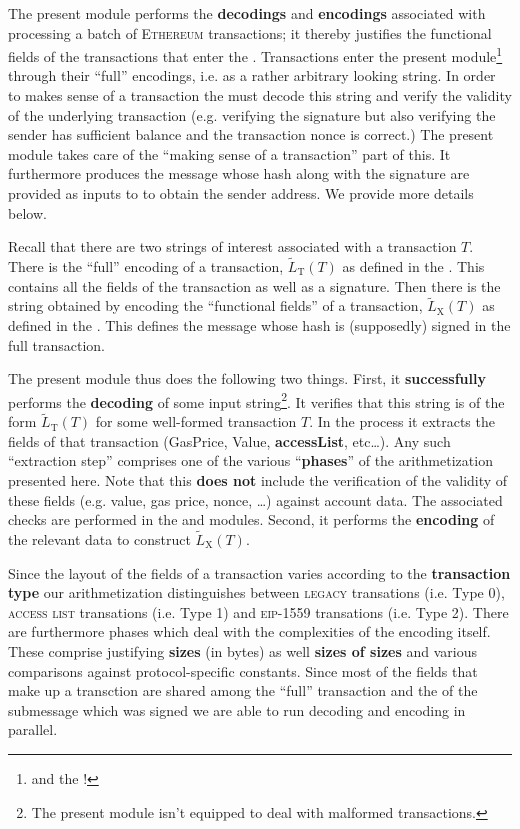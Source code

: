 The present module performs the \rlp{} \textbf{decodings} and \textbf{encodings} associated with processing a batch of \textsc{Ethereum} transactions; it thereby justifies the functional fields of the transactions that enter the \zkEvm{}.
Transactions enter the present module\footnote{and the \zkEvm{}!} through their ``full'' \rlp{} encodings, i.e. as a rather arbitrary looking string.
In order to makes sense of a transaction the \zkEvm{} must decode this string and verify the validity of the underlying transaction (e.g. verifying the signature but also verifying the sender has sufficient balance and the transaction nonce is correct.)
The present module takes care of the ``making sense of a transaction'' part of this.
It furthermore produces the message whose hash along with the signature are provided as inputs to  to obtain the sender address.
We provide more details below.

Recall that there are two \rlp{} strings of interest associated with a transaction $T$.
There is the ``full'' \rlp{} encoding of a transaction, $\widetilde{L}_{\mathrm{T}}(T)$ as defined in the \cite{EYP}.
This contains all the fields of the transaction as well as a signature.
Then there is the \rlp{} string obtained by \rlp{} encoding the ``functional fields'' of a transaction, $\widetilde{L}_{\mathrm{X}}(T)$ as defined in the \cite{EYP}.
This defines the message whose hash is (supposedly) signed in the full transaction.

The present module thus does the following two things.
First, it \textbf{successfully} performs the \rlp{} \textbf{decoding} of some input string\footnote{The present module isn't equipped to deal with malformed transactions.}.
It verifies that this string is of the form $\widetilde{L}_{\mathrm{T}}(T)$ for some well-formed transaction $T$.
In the process it extracts the fields of that transaction (GasPrice, Value, \textbf{accessList}, etc\dots{}).
Any such ``extraction step'' comprises one of the various ``\textbf{phases}'' of the arithmetization presented here.
Note that this \textbf{does not} include the verification of the validity of these fields (e.g. value, gas price, nonce, \dots) against account data.
The associated checks are performed in the \txnDataMod{} and \hubMod{} modules.
Second, it performs the \rlp{} \textbf{encoding} of the relevant data to construct $\widetilde{L}_{\mathrm{X}}(T)$.

Since the layout of the fields of a transaction varies according to the \textbf{transaction type} our arithmetization distinguishes between
\textsc{legacy} transations (i.e. Type 0),
\textsc{access list} transations (i.e. Type 1) and
\textsc{eip-1559} transations (i.e. Type 2).
There are furthermore phases which deal with the complexities of the \rlp{} encoding itself.
These comprise justifying \textbf{sizes} (in bytes) as well \textbf{sizes of sizes} and various comparisons against protocol-specific constants.
Since most of the fields that make up a transction are shared among the ``full'' transaction \rlp{} and the \rlp{} of the submessage which was signed we are able to run decoding and encoding in parallel.


